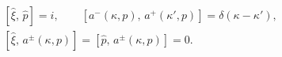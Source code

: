 \begin{equation}
\begin{split}
&[\hat{\xi},\,\hat{p}]=i,\qquad
[a^{-}(\kappa,p),\,a^+(\kappa',p)]=\delta(\kappa -\kappa'),
\\
&
[\hat{\xi},\,a^{\pm}(\kappa,p)]=
[\hat{p},\,a^{\pm}(\kappa,p)]=0.
\end{split}
\end{equation}

